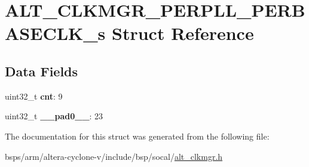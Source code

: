 \hypertarget{structALT__CLKMGR__PERPLL__PERBASECLK__s}{}\section{A\+L\+T\+\_\+\+C\+L\+K\+M\+G\+R\+\_\+\+P\+E\+R\+P\+L\+L\+\_\+\+P\+E\+R\+B\+A\+S\+E\+C\+L\+K\+\_\+s Struct Reference}
\label{structALT__CLKMGR__PERPLL__PERBASECLK__s}
\subsection*{Data Fields}
\begin{DoxyCompactItemize}
\item 
\mbox{\label{structALT__CLKMGR__PERPLL__PERBASECLK__s_adb27be714500477fb63a2431865865b7}} 
uint32\+\_\+t {\bfseries cnt}\+: 9
\item 
\mbox{\label{structALT__CLKMGR__PERPLL__PERBASECLK__s_ab556b1ceeb5e7ac6a611c7539d8b3eab}} 
uint32\+\_\+t {\bfseries \+\_\+\+\_\+pad0\+\_\+\+\_\+}\+: 23
\end{DoxyCompactItemize}


The documentation for this struct was generated from the following file\+:\begin{DoxyCompactItemize}
\item 
bsps/arm/altera-\/cyclone-\/v/include/bsp/socal/\mbox{\hyperlink{alt__clkmgr_8h}{alt\+\_\+clkmgr.\+h}}\end{DoxyCompactItemize}
